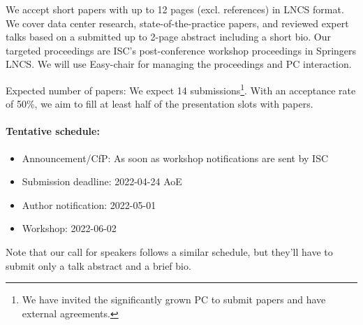\documentclass[a4paper,10pt]{article}
\begin{document}
We accept short papers with up to 12 pages (excl. references) in LNCS format.
We cover data center research, state-of-the-practice papers, and reviewed expert talks based on a submitted up to 2-page abstract including a short bio.
Our targeted proceedings are ISC's post-conference workshop proceedings in Springers LNCS.
We will use Easy-chair for managing the proceedings and PC interaction.

Expected number of papers: We expect 14 submissions\footnote{We have invited the significantly grown PC to submit papers and have external agreements.}.
With an acceptance rate of 50\%, we aim to fill at least half of the presentation slots with papers.

\paragraph{Tentative schedule:}
\begin{itemize}
  \item Announcement/CfP: As soon as workshop notifications are sent by ISC
  \item Submission deadline: 2022-04-24 AoE
  \item Author notification: 2022-05-01
  \item Workshop: 2022-06-02
\end{itemize}
Note that our call for speakers follows a similar schedule, but they'll have to submit only a talk abstract and a brief bio.
\end{document}
